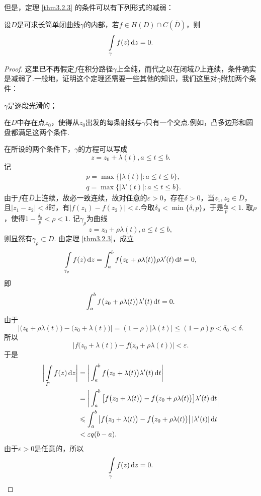 但是，定理 \ref{thm3.2.3} 的条件可以有下列形式的减弱：
\begin{theorem}\label{thm3.2.4}
  设$D$是可求长简单闭曲线$\gamma$的内部，若$f\in H(D)\cap C(\bar D)$，则
  \[
    \int\limits_\gamma f(z)\mathop{}\!\mathrm dz= 0.
  \]
\end{theorem}
\begin{proof}
  这里已不再假定$f$在积分路径$\gamma$上全纯，而代之以在闭域$D$上连续，条件确实是减弱了.一般地，证明这个定理还需要一些其他的知识，我们这里对$\gamma$附加两个条件：
\begin{eenum}
  \item $\gamma$是逐段光滑的；
  \item 在$D$中存在点$z_0$，使得从$z_0$出发的每条射线与$\gamma$只有一个交点.例如，凸多边形和圆盘都满足这两个条件.
\end{eenum}

在所设的两个条件下，$\gamma$的方程可以写成
\[
  z = z_0 + \lambda(t), a\le t\le b.
\]
记
\begin{align*}
  & p = \max\{|\lambda(t)|:a\le t\le b\},\\
  & q = \max\{|\lambda'(t)|:a\le t\le b\}.
\end{align*}
由于$f$在$\bar D$上连续，故必一致连续，故对任意的$\varepsilon>0$，存在$\delta>0$，当$z_1,z_2\in\bar D$，且$|z_1-z_2|<\delta$时，有$|f(z_1)-f(z_2)|<\varepsilon$.今取$\delta_0<\min\{\delta,p\}$，于是$\frac{\delta_0}p<1$. 取$\rho$，使得$1-\frac{\delta_0}p<\rho<1$. 记$\gamma_\rho$为曲线
\[
  z = z_0 + \rho\lambda(t), a\le t\le b,
\]
则显然有$\gamma_\rho\subset D$. 由定理 \ref{thm3.2.3}，成立
\[
  \int\limits_{\gamma_\rho}f(z)\mathop{}\!\mathrm dz = \int_a^bf\big(z_0+\rho\lambda(t)\big)
  \rho\lambda'(t)\mathop{}\!\mathrm{d} t = 0,
\]
即
\[
  \int_a^bf\big(z_0 + \rho\lambda(t)\big)\lambda'(t) \mathop{}\!\mathrm{d} t = 0.
\]
由于
\[
  \big|\big(z_0+\rho\lambda(t)\big)-\big(z_0+\lambda(t)\big)\big|
  = (1-\rho)|\lambda(t)|\le(1-\rho)p<\delta_0<\delta.
\]
所以
\[
  \big|f\big(z_0+\lambda(t)\big)-f\big(z_0 + \rho\lambda(t)\big)\big| < \varepsilon.
\]
于是
\begin{align*}
  \bigg|\int\limits_\varGamma f(z)\mathop{}\!\mathrm dz\bigg|
  & = \bigg|\int_a^bf\big(z_0+\lambda(t)\big)\lambda'(t)\mathop{}\!\mathrm{d} t\bigg| \\
  & = \bigg|\int_a^b\big[f\big(z_0+\lambda(t)\big)-f\big(z_0+\rho\lambda(t)\big)\big]
    \lambda'(t)\mathop{}\!\mathrm{d} t\bigg| \\
  & \leqslant \int_a^b\big|f\big(z_0+\lambda(t)\big)-f\big(z_0+
  \rho\lambda(t)\big)\big|\,|\lambda'(t)|\mathop{}\!\mathrm{d} t \\
  & < \varepsilon q(b-a).
\end{align*}
由于$\varepsilon>0$是任意的，所以
\begin{equation*}
  \int\limits_\gamma f(z)\mathop{}\!\mathrm dz = 0. \qedhere
\end{equation*}
\end{proof}

